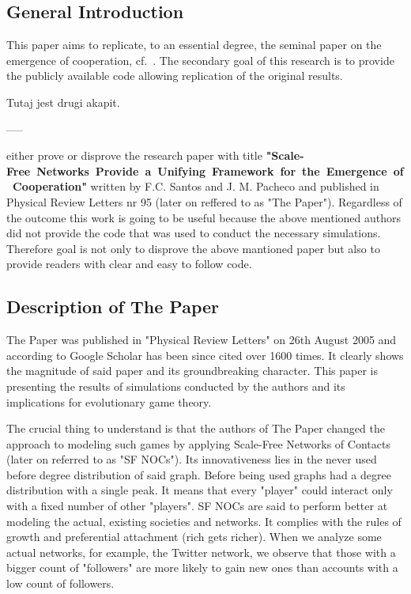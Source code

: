 \documentclass[english, twoside, 12pt, a4paper]{article}
\theoremstyle{definition}
\theoremstyle{plain}
\theoremstyle{remark}
\begin{document}
\subsection{General Introduction}

This paper aims to replicate, to an essential degree, the seminal paper on the emergence of cooperation, cf.~\cite{santos2005scale}. The secondary goal 
of this research is to provide the publicly available code allowing replication of the original results.

Tutaj jest drugi akapit. 

-----

either prove or disprove the research paper with title \mbox{\textbf{"Scale-Free Networks Provide a Unifying Framework for the Emergence of Cooperation"}}
 written by F.C. Santos and J. M. Pacheco and published in Physical Review Letters nr 95 (later on reffered to as "The Paper"). Regardless of the outcome this work is going to be useful
 because the above mentioned authors did not provide the code that was used to conduct the necessary simulations. Therefore goal is not only
 to disprove the above mantioned paper but also to provide readers with clear and easy to follow code. 
 
 \subsection{Description of The Paper}

 The Paper was published in "Physical Review Letters" on 26th August 2005 and according to Google Scholar has been since cited over 1600 times. 
 It clearly shows the magnitude of said paper and its groundbreaking character. This paper is presenting the results of simulations conducted by the authors and its 
 implications for evolutionary game theory.
 
 The crucial thing to understand is that the authors of The Paper changed the approach to modeling such games by applying
 Scale-Free Networks of Contacts (later on referred to as "SF NOCs"). Its innovativeness lies in the never used before degree distribution of said graph. Before being used
 graphs had a degree distribution with a single peak. It means that every "player" could interact only with a fixed number of other "players". SF NOCs are said to 
 perform better at modeling the actual, existing societies and networks. It complies with the rules of growth and preferential attachment (rich gets richer). When we 
 analyze some actual networks, for example, the Twitter network, we observe that those with a bigger count of "followers" are more likely to gain new ones than accounts 
 with a low count of followers. 
 
\end{document}
